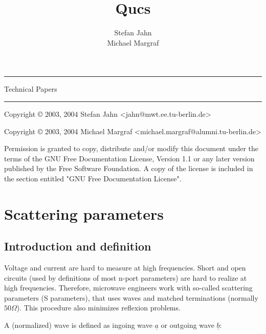 \documentclass[10pt]{report}
\author{Stefan Jahn\vspace*{6pt}\\Michael Margraf}
\title{Qucs}
\date{}
\makeatletter
\renewcommand{\maketitle}{\begin{titlepage}%
    \setlength{\parindent}{0pt}
    \vspace*{3cm}
    \begin{flushleft}
      \textbf{\begin{huge}\@title\end{huge}}
    \end{flushleft}
    \hrule height 3pt
    \begin{flushright}
      \begin{LARGE}Technical Papers\end{LARGE}
    \end{flushright}
    \vfill
    \begin{flushright}
      \begin{Large}\@author\end{Large}
    \end{flushright}
    \hrule height 3pt
    \vspace*{24pt}

Copyright \copyright{} 2003, 2004 Stefan Jahn
\textless jahn@mwt.ee.tu-berlin.de\textgreater

Copyright \copyright{} 2003, 2004 Michael Margraf
\textless michael.margraf@alumni.tu-berlin.de\textgreater

    \vspace*{12pt}

Permission is granted to copy, distribute and/or modify this document
under the terms of the GNU Free Documentation License, Version 1.1 or
any later version published by the Free Software Foundation.  A copy
of the license is included in the section entitled "GNU Free
Documentation License".

    \vspace*{1cm}

    \end{titlepage}%
    \setcounter{footnote}{0}%
}
\makeatother
\begin{document}
\maketitle

\tableofcontents

\setlength{\parindent}{0pt}
\newpage

\chapter{Scattering parameters}

\section{Introduction and definition}

Voltage and current are hard to measure at high frequencies.  Short
and open circuits (used by definitions of most n-port parameters) are
hard to realize at high frequencies.  Therefore, microwave engineers
work with so-called scattering parameters (S parameters), that uses
waves and matched terminations (normally $50 \Omega$).  This procedure
also minimizes reflexion problems.

\addvspace{12pt}

A (normalized) wave is defined as ingoing wave $\underline{a}$ or
outgoing wave $\underline{b}$:
\end{document}
